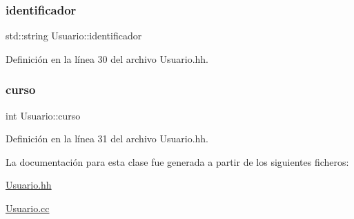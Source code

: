 \subsubsection{\texorpdfstring{identificador}{identificador}}
{\footnotesize\ttfamily std\+::string Usuario\+::identificador\hspace{0.3cm}{\ttfamily [private]}}



Definición en la línea 30 del archivo Usuario.\+hh.

\mbox{\label{class_usuario_aa767fe2d1198f2c97791073bc55803e7}} 
\subsubsection{\texorpdfstring{curso}{curso}}
{\footnotesize\ttfamily int Usuario\+::curso\hspace{0.3cm}{\ttfamily [private]}}



Definición en la línea 31 del archivo Usuario.\+hh.



La documentación para esta clase fue generada a partir de los siguientes ficheros\+:\begin{DoxyCompactItemize}
\item 
\mbox{\hyperlink{_usuario_8hh}{Usuario.\+hh}}\item 
\mbox{\hyperlink{_usuario_8cc}{Usuario.\+cc}}\end{DoxyCompactItemize}
